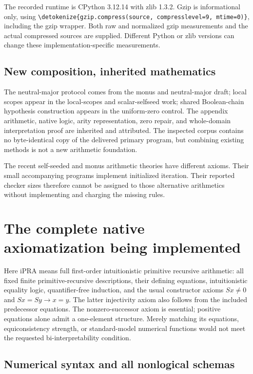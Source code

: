 \documentclass[11pt,letterpaper]{article}
\theoremstyle{definition}\newtheorem{definition}[theorem]{Definition}
\theoremstyle{remark}\newtheorem{remark}[theorem]{Remark}
\newcommand{\file}[1]{\expandafter\nolinkurl\expandafter{\detokenize{#1}}}
\begin{document}
The recorded runtime is CPython 3.12.14 with zlib 1.3.2. Gzip is informational
only, using \file{gzip.compress(source, compresslevel=9, mtime=0)}, including
the gzip wrapper. Both raw and normalized gzip measurements and the actual
compressed sources are supplied. Different Python or zlib versions can change
these implementation-specific measurements.

\subsection{New composition, inherited mathematics}

The neutral-major protocol comes from the monus and neutral-major draft;
local scopes appear in the local-scopes and scalar-selfseed work; shared
Boolean-chain hypothesis construction appears in the uniform-zero control.
The appendix arithmetic, native logic, arity representation, zero repair,
and whole-domain interpretation proof are inherited and attributed.
The inspected corpus contains no byte-identical copy of the delivered primary
program, but combining existing methods is not a new arithmetic foundation.

The recent self-seeded and monus arithmetic theories have different axioms.
Their small accompanying programs implement initialized iteration. Their
reported checker sizes therefore cannot be assigned to those alternative
arithmetics without implementing and charging the missing rules.

\section{The complete native axiomatization being implemented}
\label{sec:complete-core}

Here iPRA means full first-order intuitionistic primitive recursive arithmetic:
all fixed finite primitive-recursive descriptions, their defining equations,
intuitionistic equality logic, quantifier-free induction, and the usual
constructor axioms $Sx\ne0$ and $Sx=Sy\to x=y$. The latter injectivity axiom
also follows from the included predecessor equations. The nonzero-successor
axiom is essential; positive equations alone admit a one-element structure.
Merely matching
its equations, equiconsistency strength, or standard-model numerical functions
would not meet the requested bi-interpretability condition.

\subsection{Numerical syntax and all nonlogical schemas}
\end{document}
